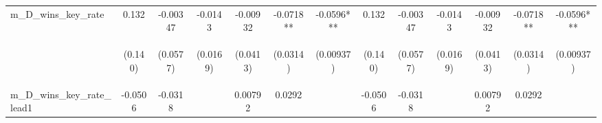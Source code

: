 \documentclass[]{article}
\begin{document}
\begin{center}
\begin{tabular}{lcccccccccccc}
m\_D\_wins\_key\_rate & 0.132 & -0.00347 & -0.0143 & -0.00932 & -0.0718** & -0.0596*** & 0.132 & -0.00347 & -0.0143 & -0.00932 & -0.0718** & -0.0596*** \\
\vspace{4pt} & \begin{footnotesize}(0.140)\end{footnotesize} & \begin{footnotesize}(0.0577)\end{footnotesize} & \begin{footnotesize}(0.0169)\end{footnotesize} & \begin{footnotesize}(0.0413)\end{footnotesize} & \begin{footnotesize}(0.0314)\end{footnotesize} & \begin{footnotesize}(0.00937)\end{footnotesize} & \begin{footnotesize}(0.140)\end{footnotesize} & \begin{footnotesize}(0.0577)\end{footnotesize} & \begin{footnotesize}(0.0169)\end{footnotesize} & \begin{footnotesize}(0.0413)\end{footnotesize} & \begin{footnotesize}(0.0314)\end{footnotesize} & \begin{footnotesize}(0.00937)\end{footnotesize} \\
m\_D\_wins\_key\_rate\_lead1 & -0.0506 & -0.0318 &  & 0.00792 & 0.0292 &  & -0.0506 & -0.0318 &  & 0.00792 & 0.0292 &  \\

\end{tabular}
\end{center}
\end{document}
